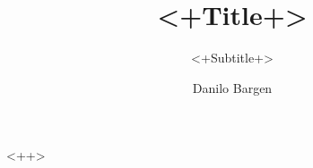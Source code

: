 \documentclass[10pt,a4paper]{scrartcl}
\author{Danilo Bargen}
\title{<+Title+>}
\subtitle{<+Subtitle+>}
\begin{document}
\begin{titlepage}
\maketitle
\vspace{120mm}
\thispagestyle{empty} %
\end{titlepage}

<++>
\end{document}
